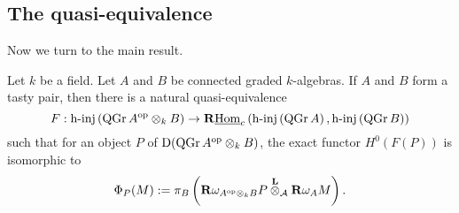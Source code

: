 \documentclass[dissertation.tex]{subfiles}
\begin{document}
\subsection{The quasi-equivalence}

Now we turn to the main result. 

\begin{theorem} \label{theorem: derived morita for NCP}
  Let \(k\) be a field. Let \(A\) and \(B\) be connected graded \(k\)-algebras. If \(A\) and \(B\) form a tasty pair, then there is a natural quasi-equivalence 
  \begin{displaymath}
    F : \operatorname{h-inj}\left(\operatorname{QGr}A^{\operatorname{op}} \otimes_k B\right) \to \mathbf{R}\underline{\operatorname{Hom}}_c\left( \operatorname{h-inj}\left(\operatorname{QGr}A\right), \operatorname{h-inj}\left(\operatorname{QGr}B\right) \right)
  \end{displaymath}
  such that for an object \(P\) of \(\mathrm{D}(\operatorname{QGr}A^{\operatorname{op}} \otimes_k B)\), the exact functor \(H^0(F(P))\) is isomorphic to 
  \begin{displaymath}
    \Phi_P(M) :=  \pi_B \left( \mathbf{R}\omega_{A^{\operatorname{op}} \otimes_k B} P \overset{\mathbf{L}}{\otimes}_{\mathcal A} \mathbf{R}\omega_A M \right).
  \end{displaymath}
\end{theorem}
\end{document}

